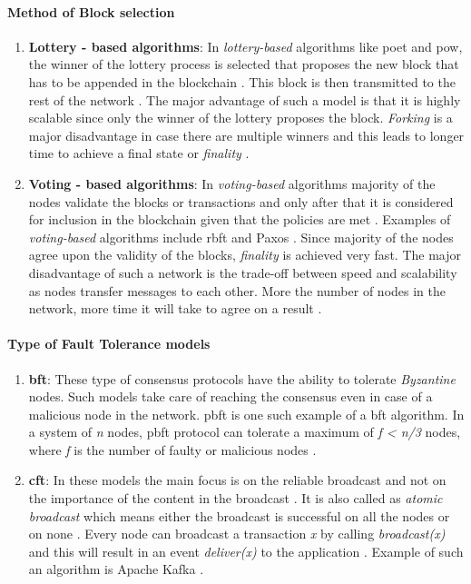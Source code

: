 \documentclass[
  a4paper,  %
  twoside,  %
  bibliography=totoc,
  headsepline,
  cleardoublepage=empty,
  parskip=half,
  draft=false
]{scrbook}
\begin{document}
\paragraph{Method of Block selection}
\begin{enumerate}
    \item \textbf{Lottery - based algorithms}: In \textit{lottery-based} algorithms like \gls{poet} and \gls{pow}, the winner of the lottery process is selected that proposes the new block that has to be appended in the blockchain \cite{Con}. This block is then transmitted to the rest of the network \cite{HW1}. The major advantage of such a model is that it is highly scalable since only the winner of the lottery proposes the block. \textit{Forking} is a major disadvantage in case there are multiple winners and this leads to longer time to achieve a final state or \textit{finality} \cite{HW1}.
    \item \textbf{Voting - based algorithms}: In \textit{voting-based} algorithms majority of the nodes validate the blocks or transactions and only after that it is considered for inclusion in the blockchain given that the policies are met \cite{HW1}. Examples of \textit{voting-based} algorithms include \gls{rbft} and Paxos \cite{HW1}. Since majority of the nodes agree upon the validity of the blocks, \textit{finality} is achieved very fast. The major disadvantage of such a network is the trade-off between speed and scalability as nodes transfer messages to each other. More the number of nodes in the network, more time it will take to agree on a result \cite{HW1}.
\end{enumerate}

\paragraph{Type of Fault Tolerance models}
\begin{enumerate}
    \item \textbf{\gls{bft}}: These type of consensus protocols have the ability to tolerate \textit{Byzantine} nodes. Such models take care of reaching the consensus even in case of a malicious node in the network. \gls{pbft} is one such example of a \gls{bft} algorithm. In a system of \textit{n} nodes, \gls{pbft} protocol can tolerate a maximum of \textit{f < n/3} nodes, where \textit{f} is the number of faulty or malicious nodes \cite{Con}.
    \item \textbf{\gls{cft}}: In these models the main focus is on the reliable broadcast and not on the importance of the content in the broadcast \cite{Con}. It is also called as \textit{atomic broadcast} which means either the broadcast is successful on all the nodes or on none \cite{Con}. Every node can broadcast a transaction \textit{x} by calling \textit{broadcast(x)} and this will result in an event \textit{deliver(x)} to the application \cite{Con}. Example of such an algorithm is Apache Kafka \cite{AK}.
\end{enumerate}
\end{document}
